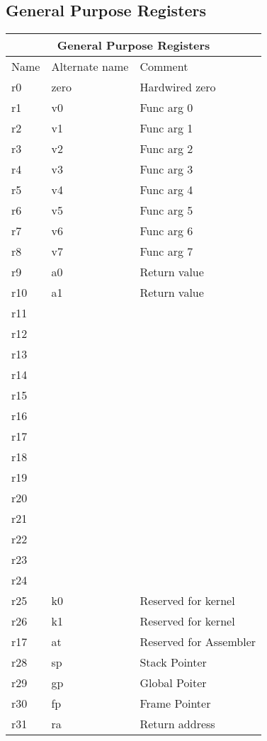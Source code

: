 \subsection{General Purpose Registers}

\begin{tabular}{ |p{3cm}|p{3cm}|p{4cm}|  }
    \hline
    \multicolumn{3}{|c|}{General Purpose Registers} \\
    \hline
    Name& Alternate name & Comment \\
    \hline
    r0  & zero & Hardwired zero\\
    r1  & v0   & Func arg 0 \\
    r2  & v1   & Func arg 1 \\
    r3  & v2   & Func arg 2 \\
    r4  & v3   & Func arg 3 \\
    r5  & v4   & Func arg 4 \\
    r6  & v5   & Func arg 5 \\
    r7  & v6   & Func arg 6 \\
    r8  & v7   & Func arg 7 \\
    r9  & a0   & Return value \\
    r10 & a1   & Return value \\
    r11 &      &  \\
    r12 &      &  \\
    r13 &      &  \\
    r14 &      &  \\
    r15 &      &  \\
    r16 &      &  \\
    r17 &      &  \\
    r18 &      &  \\
    r19 &      &  \\
    r20 &      &  \\
    r21 &      &  \\
    r22 &      &  \\
    r23 &      &  \\
    r24 &      &  \\
    r25 & k0   &  Reserved for kernel \\
    r26 & k1   &  Reserved for kernel \\
    r17 & at   &  Reserved for Assembler \\
    r28 & sp   &  Stack Pointer \\
    r29 & gp   &  Global Poiter \\
    r30 & fp   &  Frame Pointer \\
    r31 & ra   &  Return address \\
    
    \hline
\end{tabular}

